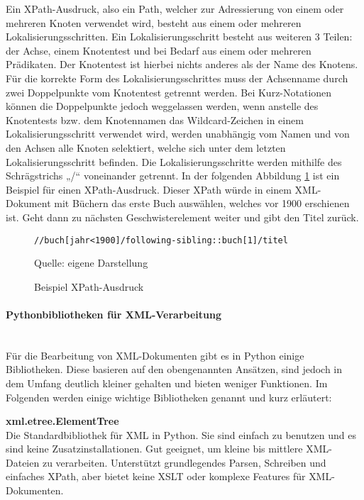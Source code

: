 Ein XPath-Ausdruck, also ein Path, welcher zur Adressierung von einem oder mehreren Knoten verwendet wird,
besteht aus einem oder mehreren Lokalisierungsschritten.
Ein Lokalisierungsschritt besteht aus weiteren 3 Teilen: der Achse, einem Knotentest und bei Bedarf aus einem oder mehreren Prädikaten.
Der Knotentest ist hierbei nichts anderes als der Name des Knotens.
Für die korrekte Form des Lokalisierungsschrittes muss der Achsenname durch zwei Doppelpunkte vom Knotentest getrennt werden.
Bei Kurz-Notationen können die Doppelpunkte jedoch weggelassen werden, wenn anstelle des Knotentests bzw.
dem Knotennamen das Wildcard-Zeichen in einem Lokalisierungsschritt verwendet wird,
werden unabhängig vom Namen und von den Achsen alle Knoten selektiert, welche sich unter dem letzten Lokalisierungsschritt befinden.
Die Lokalisierungsschritte werden mithilfe des Schrägstrichs „/“ voneinander getrennt. \cite{XPath2025}
In der folgenden Abbildung \ref{fig: XPath-Ausdruck} ist ein Beispiel für einen XPath-Ausdruck.
Dieser XPath würde in einem XML-Dokument mit Büchern das erste Buch auswählen, welches vor 1900 erschienen ist.
Geht dann zu nächsten Geschwisterelement weiter und gibt den Titel zurück.


\begin{figure}[H]
\centering
\begin{minipage}{0.95\textwidth}
\begin{lstlisting}[language=XPath]
//buch[jahr<1900]/following-sibling::buch[1]/titel
\end{lstlisting}
\end{minipage}
\caption{Beispiel XPath-Ausdruck}
\label{fig: XPath-Ausdruck}
    {Quelle: eigene Darstellung}
\end{figure}


\paragraph{Pythonbibliotheken für XML-Verarbeitung}

\\

Für die Bearbeitung von \ac{XML}-Dokumenten gibt es in Python einige Bibliotheken.
Diese basieren auf den obengenannten Ansätzen, sind jedoch in dem Umfang deutlich kleiner gehalten und bieten weniger Funktionen.
Im Folgenden werden einige wichtige Bibliotheken genannt und kurz erläutert:

\textbf{xml.etree.ElementTree}\\
Die Standardbibliothek für XML in Python.
Sie sind einfach zu benutzen und es sind keine Zusatzinstallationen.
Gut geeignet, um kleine bis mittlere XML-Dateien zu verarbeiten.
Unterstützt grundlegendes Parsen, Schreiben und einfaches XPath, aber bietet keine \ac{XSLT} oder komplexe Features für \ac{XML}-Dokumenten. \cite*{ElementTree2025}

